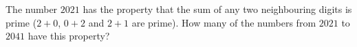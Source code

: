 The number $2021$ has the property that the sum of any two neighbouring digits is prime ($2+0$, $0+2$ and $2+1$ are prime). How many of the numbers from $2021$ to $2041$ have this property?
